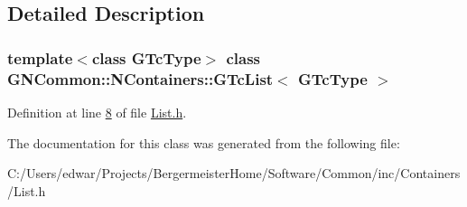 \subsection{Detailed Description}
\subsubsection*{template$<$class G\+Tc\+Type$>$\newline
class G\+N\+Common\+::\+N\+Containers\+::\+G\+Tc\+List$<$ G\+Tc\+Type $>$}



Definition at line \mbox{\hyperlink{_list_8h_source_l00008}{8}} of file \mbox{\hyperlink{_list_8h_source}{List.\+h}}.



The documentation for this class was generated from the following file\+:\begin{DoxyCompactItemize}
\item 
C\+:/\+Users/edwar/\+Projects/\+Bergermeister\+Home/\+Software/\+Common/inc/\+Containers/List.\+h\end{DoxyCompactItemize}
